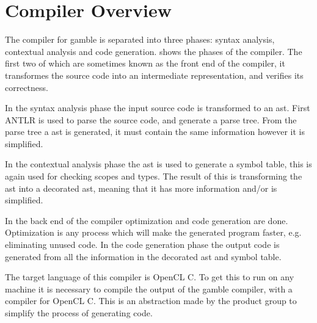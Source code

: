 \chapter{Compiler Overview}

The compiler for \gls{gamble} is separated into three phases: syntax analysis, contextual analysis and code generation.
 shows the phases of the compiler.
The first two of which are sometimes known as the front end of the compiler, it transformes the source code into an intermediate representation, and verifies its correctness. 

In the syntax analysis phase the input source code is transformed to an \acrfull{ast}. 
First ANTLR is used to parse the source code, and generate a parse tree.
From the parse tree a \acrshort{ast} is generated, it must contain the same information however it is simplified. 

In the contextual analysis phase the \acrshort{ast} is used to generate a symbol table, this is again used for checking scopes and types. 
The result of this is transforming the \acrshort{ast} into a decorated \acrshort{ast}, meaning that it has more information and/or is simplified. 

In the back end of the compiler optimization and code generation are done.
Optimization is any process which will make the generated program faster, e.g. eliminating unused code. 
In the code generation phase the output code is generated from all the information in the decorated \acrshort{ast} and symbol table.

The target language of this compiler is OpenCL C.
To get this to run on any machine it is necessary to compile the output of the \gls{gamble} compiler, with a compiler for OpenCL C.
This is an abstraction made by the product group to simplify the process of generating code.  

